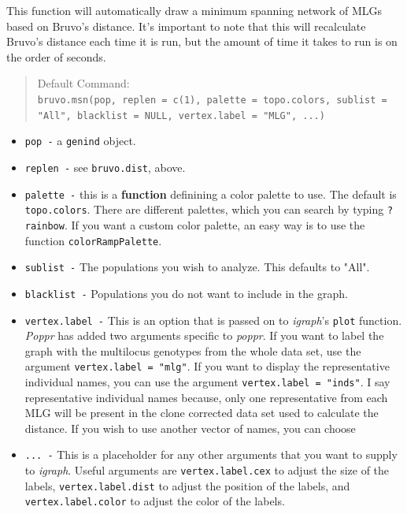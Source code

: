 \documentclass[letterpaper]{article}
\newcommand{\tab}{\hspace*{1em}}
\begin{document}
\tab\tab This function will automatically draw a minimum spanning network of MLGs based on Bruvo's distance. It's important to note that this will recalculate Bruvo's distance each time it is run, but the amount of time it takes to run is on the order of seconds.
\begin{quote}
Default Command:\\
\texttt{bruvo.msn(pop, replen = c(1), palette = topo.colors, sublist = "All", blacklist = NULL, vertex.label = "MLG", ...)}
\end{quote}
\begin{itemize}
  \item \texttt{pop -} a \texttt{genind} object.
  \item \texttt{replen -} see \texttt{bruvo.dist}, above.
  \item \texttt{palette -} this is a \textbf{function} definining a color palette to use. The default is \texttt{topo.colors}. There are different palettes, which you can search by typing \texttt{?rainbow}. If you want a custom color palette, an easy way is to use the function \texttt{colorRampPalette}.
  \item \texttt{sublist -} The populations you wish to analyze. This defaults to "All".
  \item \texttt{blacklist -} Populations you do not want to include in the graph.
  \item \texttt{vertex.label -} This is an option that is passed on to \textit{igraph}'s \texttt{plot} function. \textit{Poppr} has added two arguments specific to \textit{poppr}. If you want to label the graph with the multilocus genotypes from the whole data set, use the argument \texttt{vertex.label = "mlg"}. If you want to display the representative individual names, you can use the argument \texttt{vertex.label = "inds"}. I say representative individual names because, only one representative from each MLG will be present in the clone corrected data set used to calculate the distance. If you wish to use another vector of names, you can choose
  \item \texttt{... -} This is a placeholder for any other arguments that you want to supply to \textit{igraph}. Useful arguments are \texttt{vertex.label.cex} to adjust the size of the labels, \texttt{vertex.label.dist} to adjust the position of the labels, and \texttt{vertex.label.color} to adjust the color of the labels.
\end{itemize}
\end{document}
